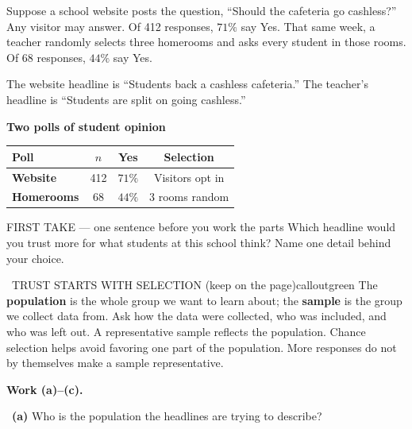 \documentclass[11pt]{article}
\begin{document}


Suppose a school website posts the question, ``Should the cafeteria go cashless?'' Any visitor may answer. Of 412 responses, $71\%$ say Yes. That same week, a teacher randomly selects three homerooms and asks every student in those rooms. Of 68 responses, $44\%$ say Yes.\par\smallskip The website headline is ``Students back a cashless cafeteria.'' The teacher's headline is ``Students are split on going cashless.''\par
\begin{center}
\textbf{Two polls of student opinion}\par\smallskip
\begin{tabular}{|l|c|c|c|}
\hline
\textbf{Poll} & \textbf{$n$} & \textbf{Yes} & \textbf{Selection} \\ \hline
\textbf{Website} & 412 & $71\%$ & Visitors opt in \\ \hline
\textbf{Homerooms} & 68 & $44\%$ & 3 rooms random \\ \hline
\end{tabular}
\end{center}
\begin{firsttakebox}{FIRST TAKE --- one sentence before you work the parts}
Which headline would you trust more for what students at this school think? Name one detail behind your choice.
\workspace{0.9in}
\end{firsttakebox}

\begin{callout}{\IconBook\ TRUST STARTS WITH SELECTION (keep on the page)}{calloutgreen}
The \textbf{population} is the whole group we want to learn about; the \textbf{sample} is the group we collect data from. Ask how the data were collected, who was included, and who was left out. A representative sample reflects the population. Chance selection helps avoid favoring one part of the population. More responses do not by themselves make a sample representative.
\end{callout}

\newpage
\textbf{Work (a)--(c).}\par\smallskip

~\textbf{(a)} Who is the population the headlines are trying to describe?\par
\workspace{0.7in}
\end{document}
